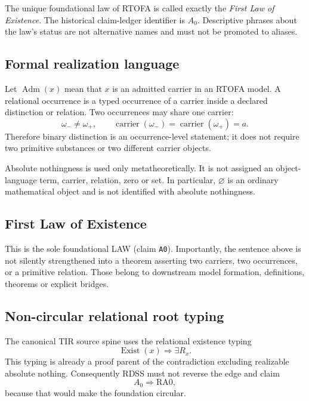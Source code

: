 \documentclass[11pt]{article}
\begin{document}
The unique foundational law of RTOFA is called exactly the \emph{First Law
of Existence}. The historical claim-ledger identifier is \(A_0\).
Descriptive phrases about the law's status are not alternative names and
must not be promoted to aliases.

\subsection{Formal realization language}

Let \(\operatorname{Adm}(x)\) mean that \(x\) is an admitted carrier in
an RTOFA model. A relational occurrence is a typed occurrence of a carrier
inside a declared distinction or relation. Two occurrences may share one
carrier:
\[
\omega_-\neq\omega_+,
\qquad
\operatorname{carrier}(\omega_-)
=
\operatorname{carrier}(\omega_+)=a.
\]
Therefore binary distinction is an occurrence-level statement; it does not
require two primitive substances or two different carrier objects.

Absolute nothingness is used only metatheoretically. It is not assigned an
object-language term, carrier, relation, zero or set. In particular,
\(\varnothing\) is an ordinary mathematical object and is not identified
with absolute nothingness.

\subsection{First Law of Existence}

\begin{center}
\end{center}

This is the sole foundational LAW (claim \texttt{A0}). Importantly, the
sentence above is not silently strengthened into a theorem asserting two
carriers, two occurrences, or a primitive relation. Those belong to downstream model formation,
definitions, theorems or explicit bridges.

\subsection{Non-circular relational root typing}

The canonical TIR source spine \cite{LipaTIR2026} uses the relational
existence typing
\[
\boxed{
\operatorname{Exist}(x)
\Longrightarrow
\exists R_x.
}
\]
This typing is already a proof parent of the contradiction excluding
realizable absolute nothing. Consequently RDSS must not reverse the edge and
claim
\[
A_0\Longrightarrow\mathrm{RA0},
\]
because that would make the foundation circular.
\end{document}
